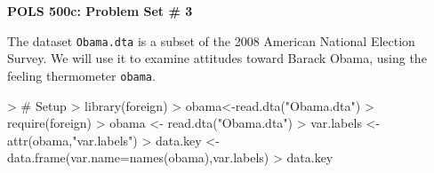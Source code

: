 \documentclass[12pt]{article}
\begin{document}


\pagestyle{empty}

\begin{center}
{\Large \textbf{POLS 500c: Problem Set \# 3}}
\end{center}

The dataset \texttt{Obama.dta} is a subset of the 2008 American National Election Survey.  We will use it to examine attitudes toward Barack Obama, using the feeling thermometer \texttt{obama}.

\begin{Schunk}
\begin{Sinput}
> # Setup
> library(foreign)
> obama<-read.dta("Obama.dta")
> require(foreign)
> obama <- read.dta("Obama.dta")
> var.labels <- attr(obama,"var.labels")
> data.key <- data.frame(var.name=names(obama),var.labels)
> data.key
\end{Sinput}
\end{Schunk}
\end{document}
